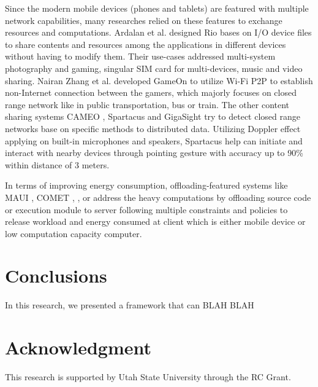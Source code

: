\documentclass[conference]{IEEEtran}
\begin{document}
Since the modern mobile devices (phones and tablets) are featured with multiple network capabilities, many researches relied on these features to exchange resources and computations. Ardalan et al. designed Rio \cite{rio} bases on I/O device files to share contents and resources among the applications in different devices without having to modify them. Their use-cases addressed multi-system photography and gaming, singular SIM card for multi-devices, music and video sharing. Nairan Zhang et al. developed GameOn \cite{gameon} to utilize Wi-Fi P2P to establish non-Internet connection between the gamers, which majorly focuses on closed range network like in public transportation, bus or train. The other content sharing systems CAMEO \cite{cameo}, Spartacus \cite{spartacus} and GigaSight \cite{crowd-sourcing} try to detect closed range networks base on specific methods to distributed data. Utilizing Doppler effect applying on built-in microphones and speakers, Spartacus help can initiate and interact with nearby devices through pointing gesture with accuracy up to 90\% within distance of 3 meters.

In terms of improving energy consumption, offloading-featured systems like MAUI \cite{maui}, COMET \cite{comet}, \cite{cloud-offload}, \cite{mobile-cloud-middleware} or \cite{fuzzy-engine} address the heavy computations by offloading source code or execution module to server following multiple constraints and policies to release workload and energy consumed at client which is either mobile device or low computation capacity computer. 

\section{Conclusions}
\label{sec:conc}
In this research, we presented a framework that can BLAH BLAH

\section*{Acknowledgment}
This research is supported by Utah State University through the RC Grant.



\end{document}
